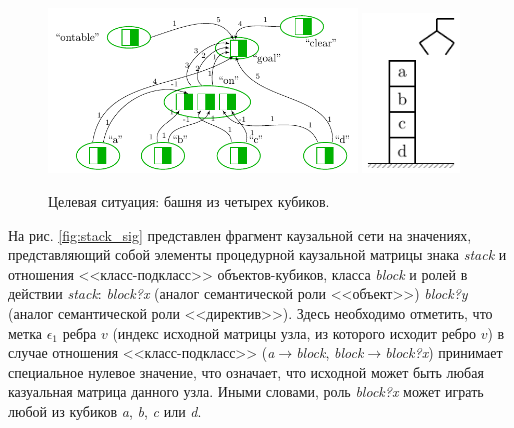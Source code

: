 \documentclass[12pt]{scrartcl}
\begin{document}
	\begin{figure}
		\centering
		\includegraphics[width=0.73\textwidth,page=1]{examples/plan/plan_nets}
		\includegraphics[width=0.23\textwidth,page=1]{examples/plan/block_world}
		\caption{Целевая ситуация: башня из четырех кубиков.}	
		\label{fig:goal_sit}	
	\end{figure}
	
	На рис. \ref{fig:stack_sig} представлен фрагмент каузальной сети на значениях, представляющий собой элементы процедурной каузальной матрицы знака \textit{stack} и отношения <<класс-подкласс>> объектов-кубиков, класса \textit{block} и ролей в действии \textit{stack}: \textit{block?x} (аналог семантической роли <<объект>>) \textit{block?y} (аналог семантической роли <<директив>>). Здесь необходимо отметить, что метка $\epsilon_1$ ребра $v$ (индекс исходной матрицы узла, из которого исходит ребро $v$) в случае отношения <<класс-подкласс>> (\textit{a}$\rightarrow$\textit{block}, \textit{block}$\rightarrow$\textit{block?x}) принимает специальное нулевое значение, что означает, что исходной может быть любая казуальная матрица данного узла. Иными словами, роль \textit{block?x} может играть любой из кубиков \textit{a}, \textit{b}, \textit{c} или \textit{d}.
	
\end{document}
